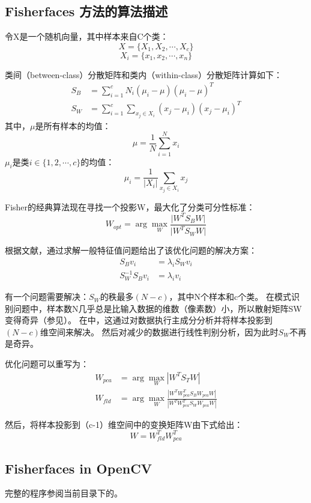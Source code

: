 \documentclass[UTF8]{ctexart}
\begin{document}
\subsection{Fisherfaces 方法的算法描述}
令X是一个随机向量，其中样本来自C个类：
$$X = \{X_1, X_2, \cdots, X_c \}$$
$$X_i = \{x_1, x_2, \cdots, x_n \}$$

类间（between-class）分散矩阵和类内（within-class）分散矩阵计算如下：
\begin{align}
	S_B &= \sum_{i = 1}^c N_i (\mu_i - \mu) (\mu_i - \mu) ^T 	\\
	S_W &= \sum_{i = 1}^c \sum_{x_j \in X_i} (x_j - \mu_i)(x_j - \mu_i)^T
\end{align}
其中，$\mu$是所有样本的均值：
$$\mu = \frac{1}{N}\sum_{i = 1}^N x_i$$
$\mu_i$是类$i \in \{1, 2, \cdots, c \}$的均值：
$$\mu_i = \frac{1}{|X_i|}\sum_{x_j \in X_i} x_j$$

Fisher的经典算法现在寻找一个投影W，最大化了分类可分性标准：
\begin{equation}
	W_{opt} = \arg \max_W \frac{\vert W^T S_B W \vert}{\vert W^T S_W W \vert}
\end{equation}

根据文献\cite{Belhumeur1997}，通过求解一般特征值问题给出了该优化问题的解决方案：
\begin{align}
	S_B v_i &= \lambda_i S_W v_i \\
	S_W^{-1} S_B v_i &= \lambda_i v_i
\end{align}

有一个问题需要解决：$S_W$的秩最多$(N - c)$，其中N个样本和c个类。 在模式识别问题中，样本数N几乎总是比输入数据的维数（像素数）小，所以散射矩阵SW变得奇异（参见\cite{Raudys1991}）。 在\cite{Belhumeur1997}中，这通过对数据执行主成分分析并将样本投影到$(N-c)$维空间来解决。 然后对减少的数据进行线性判别分析，因为此时$S_W$不再是奇异。

优化问题可以重写为：
\begin{align}
	W_{pca} &= \arg \max_W |W^T S_T W|		\\
	W_{fld} &= \arg \max_W \frac{|W^T W_{pca}^T S_B W_{pca} W|}{|W^T W_{pca}^T S_W W_{pca} W|}
\end{align}

然后，将样本投影到（c-1）维空间中的变换矩阵W由下式给出：
\begin{equation}
		W = W_{fld}^T W_{pca}^T
\end{equation}

\subsection{Fisherfaces in OpenCV}
完整的程序参阅当前目录下的{\color{blue}{facerec\_fisherfaces.cpp}}。
\end{document}
